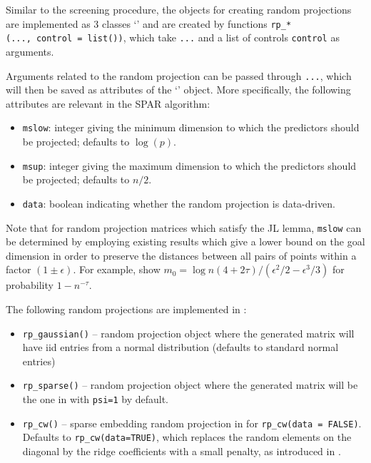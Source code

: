\documentclass[
  article]{jss}
\newcommand{\class}[1]{`\code{#1}'}
\begin{document}
Similar to the screening procedure, the objects for creating random
projections are implemented as 3 classes
\class{randomprojection} and are created by functions
\texttt{rp\_*(...,\ control\ =\ list())}, which take \texttt{...} and a
list of controls \texttt{control} as arguments.

Arguments related to the random projection can be passed through
\texttt{...}, which will then be saved as attributes of the
\class{randomprojection} object. More specifically, the following
attributes are relevant in the SPAR algorithm:

\begin{itemize}
\item
  \texttt{mslow}: integer giving the minimum dimension to which the
  predictors should be projected; defaults to \(\log(p)\).
\item
  \texttt{msup}: integer giving the maximum dimension to which the
  predictors should be projected; defaults to \(n/2\).
\item
  \texttt{data}: boolean indicating whether the random projection is
  data-driven.
\end{itemize}

Note that for random projection matrices which satisfy the JL lemma,
\texttt{mslow} can be determined by employing existing results which
give a lower bound on the goal dimension in order to preserve the
distances between all pairs of points within a factor
\((1 \pm \epsilon)\). For example, \citet{Achlioptas2003} show
\(m_0 = \log n(4 + 2\tau)/(\epsilon^2/2 − \epsilon^3/3)\) for
probability \(1 − n^{-\tau}\).

The following random projections are implemented in :

\begin{itemize}
\item
  \texttt{rp\_gaussian()} -- random projection object where the
  generated matrix will have iid entries from a normal distribution
  (defaults to standard normal entries)
\item
  \texttt{rp\_sparse()} -- random projection object where the generated
  matrix will be the one in \citep{ACHLIOPTAS2003JL} with \texttt{psi=1}
  by default.
\item
  \texttt{rp\_cw()} -- sparse embedding random projection in
  \citep{Clarkson2013LowRankApprox} for \texttt{rp\_cw(data\ =\ FALSE)}.
  Defaults to \texttt{rp\_cw(data=TRUE)}, which replaces the random
  elements on the diagonal by the ridge coefficients with a small
  penalty, as introduced in \citet{parzer2024glms}.
\end{itemize}
\end{document}
